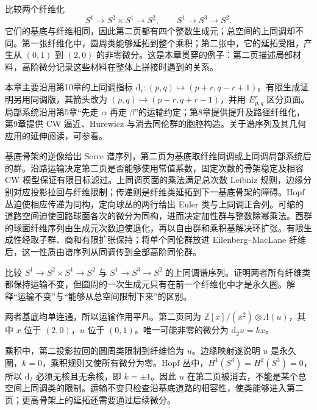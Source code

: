 比较两个纤维化
\[
	S^1\longrightarrow S^2\times S^1\longrightarrow S^2,
	\qquad S^1\longrightarrow S^3\longrightarrow S^2.
\]
它们的基底与纤维相同，因此第二页都有四个整数生成元；总空间的上同调却不同。第一张纤维化中，圆周类能够延拓到整个乘积；第二张中，它的延拓受阻，产生从 \((0,1)\) 到 \((2,0)\) 的非零微分。这是本章贯穿的例子：第二页描述局部材料，高阶微分记录这些材料在整体上拼接时遇到的关系。

\ProseParagraphBreak

本章主要沿用第10章的上同调指标 \(\mathrm d_r:(p,q)\mapsto(p+r,q-r+1)\)。有限生成证明另用同调版，其箭头改为 \((p,q)\mapsto(p-r,q+r-1)\)，并用 \(E^r_{p,q}\) 区分页面。局部系统沿用第5章“先走 \(\alpha\) 再走 \(\beta\)”的运输约定；第8章提供提升及路径纤维化，第9章提供 CW 逼近、Hurewicz 与消去同伦群的胞腔构造。关于谱序列及其几何应用的延伸阅读，可参看\cite[第三章，Spectral Sequences and Applications]{BottTu1982}。







\begin{chaptersummary}
	基底骨架的逆像给出 Serre 谱序列，第二页为基底取纤维同调或上同调局部系统后的群。沿路运输决定第二页是否能够使用常值系数，固定次数的骨架稳定及相容 CW 模型保证有限目标滤过。上同调页面的乘法满足总次数 Leibniz 规则，边缘分别对应投影拉回与纤维限制；传递则是纤维类延拓到下一基底骨架的障碍。Hopf 丛迫使相应传递为同构，定向球丛的两行给出 Euler 类与上同调正合列。可缩的道路空间迫使回路球面各次的微分为同构，进而决定加性群与整数除幂乘法。酉群的球面纤维序列由生成元次数迫使退化，再以自由群和乘积基解决环扩张。有限生成性经取子群、商和有限扩张保持；将单个同伦群放进 Eilenberg–MacLane 纤维后，这一性质由谱序列从同调传到全部高阶同伦群。
\end{chaptersummary}

\BookExercises

\begin{exercise}\label{g2:ex:serre-invariant-not-permanent}
	比较 \(S^1\to S^2\times S^1\to S^2\) 与 \(S^1\to S^3\to S^2\) 的上同调谱序列。证明两者所有纤维类都保持运输不变，但圆周的一次生成元只有在前一个纤维化中才是永久圈。解释“运输不变”与“能够从总空间限制下来”的区别。
\end{exercise}
\begin{solution}
	两者基底均单连通，所以运输作用平凡。第二页同为 \(\mathbb Z[x]/(x^2)\otimes\Lambda(u)\)，其中 \(x\) 位于 \((2,0)\)，\(u\) 位于 \((0,1)\)。唯一可能非零的微分为 \(\mathrm d_2u=kx\)。

	乘积中，第二投影拉回的圆周类限制到纤维恰为 \(u\)。边缘映射遂说明 \(u\) 是永久圈，\(k=0\)，乘积规则又使所有微分为零。Hopf 丛中，\(H^1(S^3)=H^2(S^3)=0\)，所以 \(\mathrm d_2\) 必须无核且无余核，即 \(k=\pm1\)。因此 \(u\) 在第二页被消去，不能是某个总空间上同调类的限制。运输不变只检查沿基底道路的相容性，使类能够进入第二页；更高骨架上的延拓还需要通过后续微分。
\end{solution}

